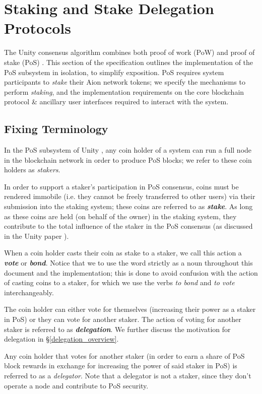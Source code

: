 \section{Staking and Stake Delegation Protocols}

The Unity consensus algorithm combines both proof of work (PoW) and proof of stake (PoS) \cite{WZS19}. This section of the specification outlines the implementation of the PoS subsystem in isolation, to simplify exposition. PoS requires system participants to \textit{stake} their Aion network tokens; we specify the mechanisms to perform \textit{staking}, and the implementation requirements on the core blockchain protocol \& ancillary user interfaces required to interact with the system. 

\subsection{Fixing Terminology}
In the PoS subsystem of Unity \cite{WZS19}, any coin holder of a system can run a full node in the blockchain network in order to produce PoS blocks; we refer to these coin holders as \textit{stakers}.

In order to support a staker's participation in PoS consensus, coins must be rendered immobile (i.e. they cannot be freely transferred to other users) via their submission into the staking system; these coins are referred to as \textbf{\textit{stake}}. As long as these coins are held (on behalf of the owner) in the staking system, they contribute to the total influence of the staker in the PoS consensus (as discussed in the Unity paper \cite{WZS19}). 

When a coin holder casts their coin as stake to a staker, we call this action a \textbf{\textit{vote}} or \textbf{\textit{bond}}. Notice that we  to use the word  strictly as a noun throughout this document and the implementation; this is done to avoid confusion with the action of casting coins to a staker, for which we use the verbs \textit{to bond} and \textit{to vote} interchangeably. 

The coin holder can either vote for themselves (increasing their power as a staker in PoS) or they can vote for another staker. The action of voting for another staker is referred to as \textbf{\textit{delegation}}. We further discuss the motivation for delegation in \S\ref{delegation_overview}.

Any coin holder that votes for another staker (in order to earn a share of PoS block rewards in exchange for increasing the power of said staker in PoS) is referred to as a \textit{delegator}. Note that a delegator is not a staker, since they don't operate a node and contribute to PoS security.

